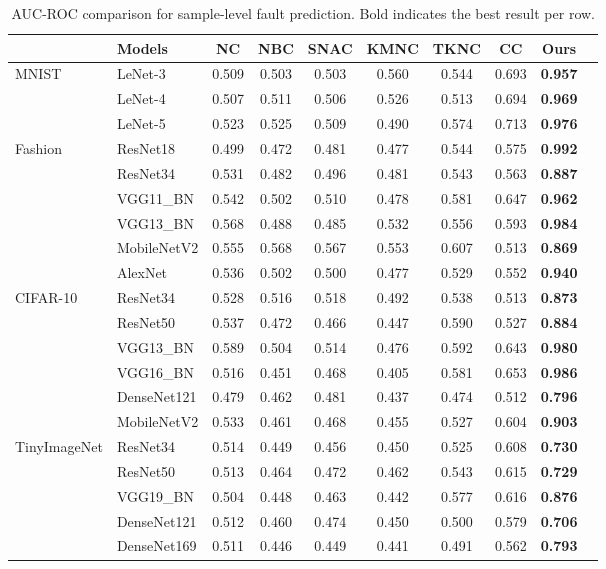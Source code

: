 \documentclass[preprint,number,5p,twocolumn]{elsarticle}
\begin{document}
\begin{table}[htbp]
  \centering
\caption{AUC-ROC comparison for sample-level fault prediction. Bold indicates the best result per row.}\label{tab:auc-roc}
  \scriptsize
  \begin{tabular}{l|lcccccccc}
    \toprule
    & \textbf{Models} & \textbf{NC} & \textbf{NBC} & \textbf{SNAC} & \textbf{KMNC} & \textbf{TKNC} & \textbf{CC} & \textbf{Ours} \\
    \midrule
    \multirow{3}{*}{MNIST}
      & LeNet-3    & 0.509 & 0.503 & 0.503 & 0.560 & 0.544 & 0.693 & \textbf{0.957} \\
      & LeNet-4    & 0.507 & 0.511 & 0.506 & 0.526 & 0.513 & 0.694 & \textbf{0.969} \\
      & LeNet-5    & 0.523 & 0.525 & 0.509 & 0.490 & 0.574 & 0.713 & \textbf{0.976} \\
    \midrule
    \multirow{6}{*}{Fashion}
      & ResNet18    & 0.499 & 0.472 & 0.481 & 0.477 & 0.544 & 0.575 & \textbf{0.992} \\
      & ResNet34    & 0.531 & 0.482 & 0.496 & 0.481 & 0.543 & 0.563 & \textbf{0.887} \\
      & VGG11\_BN   & 0.542 & 0.502 & 0.510 & 0.478 & 0.581 & 0.647 & \textbf{0.962} \\
      & VGG13\_BN   & 0.568 & 0.488 & 0.485 & 0.532 & 0.556 & 0.593 & \textbf{0.984} \\
      & MobileNetV2 & 0.555 & 0.568 & 0.567 & 0.553 & 0.607 & 0.513 & \textbf{0.869} \\
      & AlexNet     & 0.536 & 0.502 & 0.500 & 0.477 & 0.529 & 0.552 & \textbf{0.940} \\
    \midrule
    \multirow{6}{*}{CIFAR-10}
      & ResNet34    & 0.528 & 0.516 & 0.518 & 0.492 & 0.538 & 0.513 & \textbf{0.873} \\
      & ResNet50    & 0.537 & 0.472 & 0.466 & 0.447 & 0.590 & 0.527 & \textbf{0.884} \\
      & VGG13\_BN   & 0.589 & 0.504 & 0.514 & 0.476 & 0.592 & 0.643 & \textbf{0.980} \\
      & VGG16\_BN   & 0.516 & 0.451 & 0.468 & 0.405 & 0.581 & 0.653 & \textbf{0.986} \\
      & DenseNet121 & 0.479 & 0.462 & 0.481 & 0.437 & 0.474 & 0.512 & \textbf{0.796} \\
      & MobileNetV2 & 0.533 & 0.461 & 0.468 & 0.455 & 0.527 & 0.604 & \textbf{0.903} \\
    \midrule
    \multirow{5}{*}{TinyImageNet}
      & ResNet34    & 0.514 & 0.449 & 0.456 & 0.450 & 0.525 & 0.608 & \textbf{0.730} \\
      & ResNet50    & 0.513 & 0.464 & 0.472 & 0.462 & 0.543 & 0.615 & \textbf{0.729} \\
      & VGG19\_BN   & 0.504 & 0.448 & 0.463 & 0.442 & 0.577 & 0.616 & \textbf{0.876} \\
      & DenseNet121 & 0.512 & 0.460 & 0.474 & 0.450 & 0.500 & 0.579 & \textbf{0.706} \\
      & DenseNet169 & 0.511 & 0.446 & 0.449 & 0.441 & 0.491 & 0.562 & \textbf{0.793} \\
    \bottomrule
  \end{tabular}
\end{table}
\end{document}
